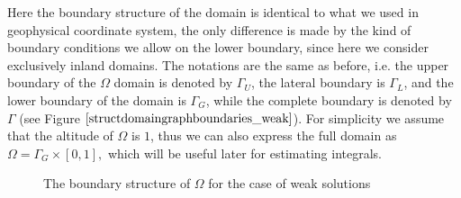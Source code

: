 \documentclass[12pt]{report}
\numberwithin{theorem}{chapter}
\numberwithin{corollary}{chapter}
\numberwithin{lemma}{chapter}
\numberwithin{remark}{chapter}
\numberwithin{definition}{chapter}
\numberwithin{prop}{chapter}
\begin{document}
Here the boundary structure of the domain is identical to what we used in geophysical coordinate system, the only difference is made by the kind of boundary conditions we allow on the lower boundary, since here we consider exclusively inland domains. The notations are the same as before, i.e. the upper boundary of the $\Omega$ domain is denoted by $\Gamma_U$, the lateral boundary is $\Gamma_L$, and the lower boundary of the domain is $\Gamma_G$, while the complete boundary is denoted by $\Gamma$ (see Figure $\ref{structdomaingraphboundaries_weak}$). For simplicity we assume that the altitude of $\Omega$ is $1$, thus we can also express the full domain as $\Omega =  \Gamma_G \times [0,1],$ which will be useful later for estimating integrals.

  \begin{figure}[!h]
  \centering
  \caption{The boundary structure of $\Omega$ for the case of weak solutions}
  \label{structdomaingraphboundaries_weak}
\end{figure}
\end{document}
